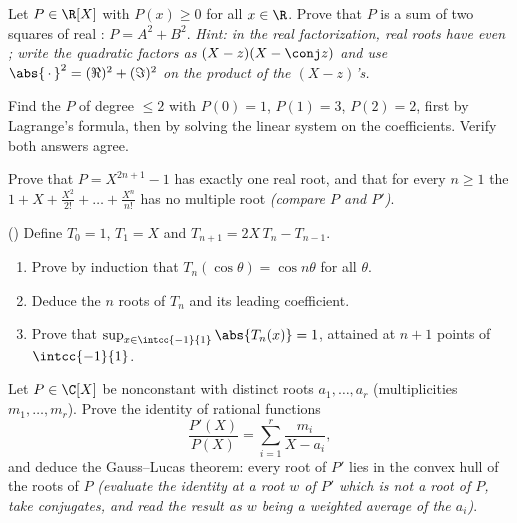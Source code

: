 \begin{exercise}[$\star\star$]\label{exo:b1:poly:7}
Let $P \in \R[X]$ with $P(x) \geq 0$ for all $x \in \R$. Prove that
$P$ is a sum of two squares of real : $P = A^2 + B^2$.
\emph{Hint: in the real factorization, real roots have even
; write the quadratic factors as $(X - z)(X - \conj z)$
and use $\abs{\,\cdot\,}^2 = (\Re)^2 + (\Im)^2$ on the product of the
$(X - z)$'s.}
\end{exercise}

\begin{exercise}[$\star\star$]\label{exo:b1:poly:8}
Find the  $P$ of degree $\leq 2$ with $P(0) = 1$, $P(1) =
3$, $P(2) = 2$, first by Lagrange's formula, then by solving the
linear system on the coefficients. Verify both answers agree.
\end{exercise}

\begin{exercise}[$\star\star$]\label{exo:b1:poly:9}
Prove that $P = X^{2n+1} - 1$ has exactly one real root, and that for
every $n \geq 1$ the  $1 + X + \frac{X^2}{2!} + \dots +
\frac{X^n}{n!}$ has no multiple root \emph{(compare $P$ and
$P'$)}.
\end{exercise}

\begin{exercise}[$\star\star\star$]\label{exo:b1:poly:10}
() Define $T_0 = 1$, $T_1 = X$ and $T_{n+1} =
2X\,T_n - T_{n-1}$.
\begin{enumerate}
  \item Prove by induction that $T_n(\cos\theta) = \cos n\theta$ for
        all $\theta$.
  \item Deduce the $n$ roots of $T_n$ and its leading coefficient.
  \item Prove that $\sup_{x \in \intcc{-1}{1}} \abs{T_n(x)} = 1$,
        attained at $n + 1$ points of $\intcc{-1}{1}$.
\end{enumerate}
\end{exercise}

\begin{exercise}[$\star\star\star$]\label{exo:b1:poly:11}
Let $P \in \C[X]$ be nonconstant with distinct roots $a_1, \dots,
a_r$ (multiplicities $m_1, \dots, m_r$). Prove the identity of
rational functions
\[
\frac{P'(X)}{P(X)} = \sum_{i=1}^{r} \frac{m_i}{X - a_i},
\]
and deduce the Gauss--Lucas theorem: every root of $P'$ lies in the
convex hull of the roots of $P$ \emph{(evaluate the identity at a
root $w$ of $P'$ which is not a root of $P$, take conjugates, and
read the result as $w$ being a weighted average of the $a_i$)}.
\end{exercise}

